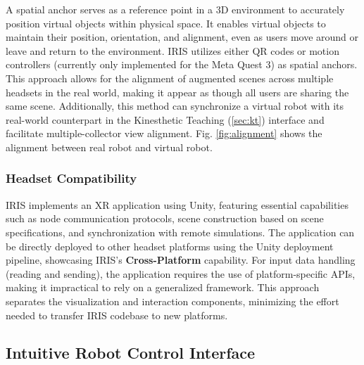 A spatial anchor serves as a reference point in a 3D environment to accurately position virtual objects within physical space.
It enables virtual objects to maintain their position, orientation, and alignment, even as users move around or leave and return to the environment.
IRIS utilizes either QR codes or motion controllers (currently only implemented for the Meta Quest 3) as spatial anchors.
This approach allows for the alignment of augmented scenes across multiple headsets in the real world, making it appear as though all users are sharing the same scene.
Additionally, this method can synchronize a virtual robot with its real-world counterpart in the {Kinesthetic Teaching} (\ref{sec:kt}) interface and facilitate multiple-collector view alignment.
Fig. \ref{fig:alignment} shows the alignment between real robot and virtual robot.



\subsubsection{Headset Compatibility}



IRIS implements an XR application using Unity, featuring essential capabilities such as node communication protocols, scene construction based on scene specifications, and synchronization with remote simulations.
The application can be directly deployed to other headset platforms using the Unity deployment pipeline, showcasing IRIS's \textbf{Cross-Platform} capability.
For input data handling (reading and sending), the application requires the use of platform-specific APIs, making it impractical to rely on a generalized framework.
This approach separates the visualization and interaction components, minimizing the effort needed to transfer IRIS codebase to new platforms.


\subsection{Intuitive Robot Control Interface}
\label{sec:intuitive_robot_interface}

